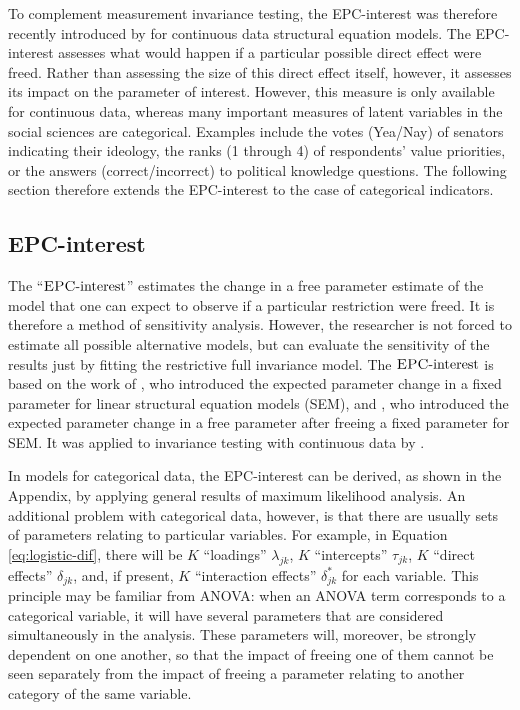 \documentclass[letterpaper,12pt]{article}
\newcommand{\da}{\textrm{{\sc {EPC}}-interest}}
\begin{document}
To complement measurement invariance testing, the 
 EPC-interest was therefore recently introduced by \citet{Oberski:WP:EPC-interest} for continuous data structural equation models. The EPC-interest assesses what would happen if a particular possible direct effect were freed. Rather than assessing the size of this direct effect itself, however, it assesses its impact on the parameter of interest. However, this measure is only available for continuous data, whereas many important measures of latent variables in the social sciences are categorical. Examples include the votes (Yea/Nay) of senators indicating their ideology, the ranks (1 through 4) of respondents' value priorities, or the answers (correct/incorrect) to political knowledge questions. The following section therefore extends the EPC-interest to the case of categorical indicators.

\subsection{EPC-interest}
\label{sec:epc-interest}

The ``$\da$'' estimates the change in a free parameter estimate of the model that one can expect to observe if a particular restriction were freed. It is therefore a method of sensitivity analysis. However, the researcher is not forced to estimate all possible alternative models, but can evaluate the sensitivity of the results just by fitting the restrictive full invariance model. 
The $\da{}$ is based on the work of \citet{saris_detection_1987}, who introduced the expected parameter change in a fixed parameter for linear structural equation models (SEM), and \citet{bentler1993some}, who introduced the expected parameter change in a free parameter after freeing a fixed parameter for SEM. It was applied to invariance testing with continuous data by \citet{Oberski:WP:EPC-interest}.

In models for categorical data, the EPC-interest can be derived, as shown in the Appendix, by applying general results of maximum likelihood analysis. An additional problem with categorical data, however, is that there are usually sets of parameters relating to particular variables. For example, in Equation \ref{eq:logistic-dif}, there will be $K$ ``loadings'' $\lambda_{jk}$, $K$ ``intercepts'' $\tau_{jk}$,  $K$ ``direct effects'' $\delta_{jk}$, and, if present, $K$ ``interaction effects'' $\delta^*_{jk}$ for each variable. This principle may be familiar from ANOVA: when an ANOVA term corresponds to a categorical variable, it will have several parameters that are considered simultaneously in the analysis. These parameters will, moreover, be strongly dependent on one another, so that the impact of freeing one of them cannot be seen separately from the impact of freeing a parameter relating to another category of the same variable. 
\end{document}
